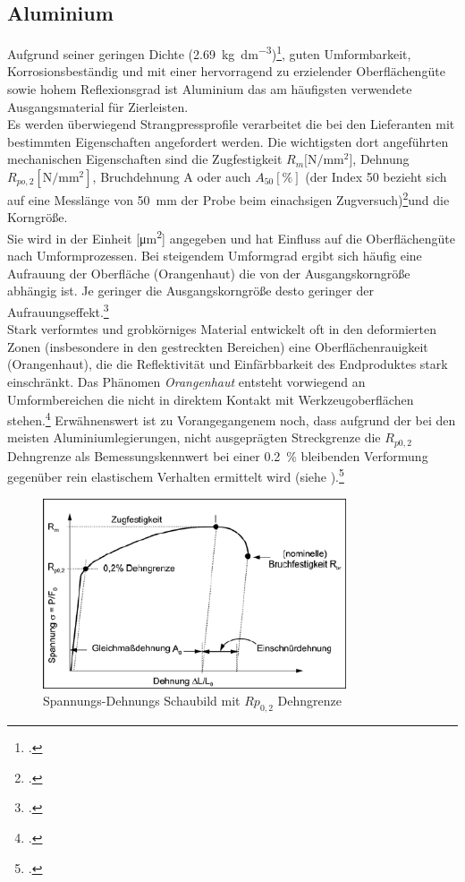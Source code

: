 \documentclass[12pt,a4paper,parskip]{scrartcl}
\begin{document}
\subsection{Aluminium}
Aufgrund seiner geringen Dichte (\SI{2.69}{\kilo\gram\per\deci\meter\cubed})\footcite[Vgl.][353]{wm}, guten Umformbarkeit, Korrosionsbeständig und mit einer hervorragend zu erzielender Oberflächengüte sowie hohem Reflexionsgrad ist Aluminium das am häufigsten verwendete Ausgangsmaterial für Zierleisten.\\
 Es werden überwiegend Strangpressprofile verarbeitet die bei den Lieferanten mit bestimmten Eigenschaften angefordert werden. Die wichtigsten dort angeführten mechanischen Eigenschaften sind die Zugfestigkeit $R_m  [\si{\newton\per\milli\meter\squared}$], Dehnung $R_{po,2} [\si{\newton\per\milli\meter\squared}]$,   Bruchdehnung A oder auch $A_{50} [\si{\percent}]$ (der Index 50 bezieht sich auf eine Messlänge  von \SI{50}{\milli\meter} der Probe  beim einachsigen Zugversuch)\footcite[Vgl.][281]{aa}und die Korngröße.\\
  Sie wird in der Einheit [\si{\micro\meter\squared}] angegeben und hat Einfluss auf die Oberflächengüte nach  Umformprozessen. Bei steigendem Umformgrad ergibt sich häufig eine Aufrauung der Oberfläche (Orangenhaut)\label{sec:orangenhaut} die von der Ausgangskorngröße abhängig ist. Je geringer die Ausgangskorngröße desto geringer der Aufrauungseffekt.\footcite[Vgl.][524]{aa}\\ Stark verformtes und grobkörniges Material entwickelt oft in den deformierten Zonen (insbesondere in den gestreckten Bereichen) eine Oberflächenrauigkeit (Orangenhaut), die die Reflektivität und Einfärbbarkeit des Endproduktes stark einschränkt. Das Phänomen \emph{Orangenhaut} entsteht vorwiegend an Umformbereichen die nicht in direktem Kontakt mit Werkzeugoberflächen stehen.\footcite[Vgl.][19]{hmp}
Erwähnenswert ist zu Vorangegangenem noch, dass aufgrund der bei den meisten Aluminiumlegierungen, nicht ausgeprägten Streckgrenze  die $R_{p0,2}$ Dehngrenze als Bemessungskennwert bei einer \SI{0.2}{\percent} bleibenden Verformung gegenüber rein elastischem Verhalten ermittelt wird (siehe ).\footcite[Vgl.][280-281]{aa}  
\begin{figure}[hbtp]
\centering
 	\includegraphics[width=0.8\textwidth]{spanndehn2}
 	\caption{Spannungs-Dehnungs Schaubild mit $Rp_{0,2} $ Dehngrenze}
 	\label{fig:spanndehn2}
 	\end{figure}
	 	 	 	 
\end{document}
